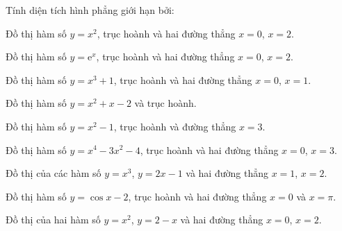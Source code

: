 \begin{bt}%
	Tính diện  tích hình phẳng giới hạn bởi:
	\begin{listEX}
		\item  Đồ thị hàm số $y=x^2$, trục hoành và hai đường thẳng $x=0$, $x=2$.
		\item Đồ thị hàm số $y=\mathrm{e}^{x}$, trục hoành  và hai đường thẳng $x=0$, $x=2$.
		\item Đồ thị hàm số  $y=x^3+1$, trục hoành và hai đường thẳng $x=0$, $x=1$.
		\item Đồ  thị hàm số $y=x^2+x-2$ và trục hoành.
		\item Đồ thị hàm số $y=x^2-1$,  trục hoành và đường thẳng $x=3$.
		\item Đồ thị hàm  số $y=x^4-3x^2-4$, trục hoành và hai đường thẳng $x=0$, $x=3$.
		\item Đồ thị của các hàm số $y=x^3$, $y=2x-1$ và hai  đường thẳng $x=1$, $x=2$.
		\item Đồ thị hàm số  $y=\cos x-2$, trục hoành và hai đường thẳng $x=0$ và $x=\pi $.
		\item Đồ thị của hai hàm số $y=x^2$, $y=2-x$ và hai đường thẳng $x=0$, $x=2$. 
	\end{listEX}
\end{bt}

